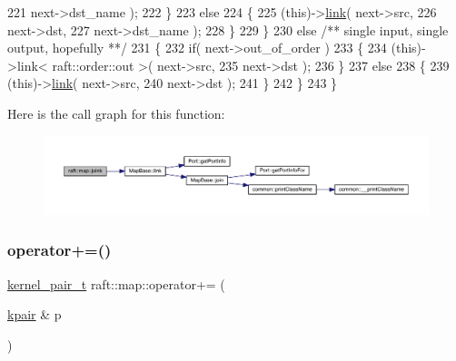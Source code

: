 \begin{DoxyCode}
221                                                   next->dst\_name );
222             \}
223             \textcolor{keywordflow}{else}
224             \{
225                 (\textcolor{keyword}{this})->\hyperlink{class_map_base_ad98ef02c1651130ad6b565ad156b97c1}{link}( next->src,
226                               next->dst,
227                               next->dst\_name );
228             \}
229         \}
230         \textcolor{keywordflow}{else} \textcolor{comment}{/** single input, single output, hopefully **/}
231         \{
232             \textcolor{keywordflow}{if}( next->out\_of\_order )
233             \{
234                 (\textcolor{keyword}{this})->link< raft::order::out >( next->src,
235                                                   next->dst );
236             \}
237             \textcolor{keywordflow}{else}
238             \{
239                 (\textcolor{keyword}{this})->\hyperlink{class_map_base_ad98ef02c1651130ad6b565ad156b97c1}{link}( next->src,
240                               next->dst );
241             \}
242         \}
243 \}
\end{DoxyCode}
Here is the call graph for this function\+:
\nopagebreak
\begin{figure}[H]
\begin{center}
\leavevmode
\includegraphics[width=350pt]{classraft_1_1map_a6d65605c4d3db559332155101ff69e1b_cgraph}
\end{center}
\end{figure}
\hypertarget{classraft_1_1map_ad4bd4cf9bdb1d49e481e572cfdb90476}{}\label{classraft_1_1map_ad4bd4cf9bdb1d49e481e572cfdb90476} 
\subsubsection{\texorpdfstring{operator+=()}{operator+=()}}
{\footnotesize\ttfamily \hyperlink{classkernel__pair__t}{kernel\+\_\+pair\+\_\+t} raft\+::map\+::operator+= (\begin{DoxyParamCaption}\item[{\hyperlink{classkpair}{kpair} \&}]{p }\end{DoxyParamCaption})}

